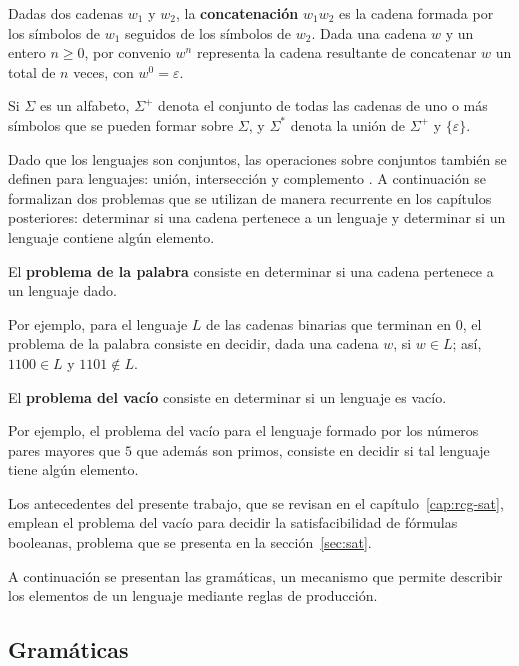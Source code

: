 Dadas dos cadenas $w_1$ y $w_2$, la \textbf{concatenación} $w_1 w_2$
es la cadena formada por los símbolos de $w_1$ seguidos de los símbolos
de $w_2$. Dada una cadena $w$ y un entero $n \ge 0$, por convenio
$w^n$ representa la cadena resultante de concatenar $w$ un total de
$n$ veces, con $w^0 = \varepsilon$.

Si $\Sigma$ es un alfabeto, $\Sigma^+$ denota el conjunto de todas las
cadenas de uno o más símbolos que se pueden formar sobre $\Sigma$, y
$\Sigma^*$ denota la unión de $\Sigma^+$ y $\{\varepsilon\}$.

Dado que los lenguajes son conjuntos, las operaciones sobre conjuntos
también se definen para lenguajes: unión, intersección y complemento
\cite{hopcroft2006introduction}. A continuación se formalizan dos
problemas que se utilizan de manera recurrente en los capítulos
posteriores: determinar si una cadena pertenece a un lenguaje y
determinar si un lenguaje contiene algún elemento.

\begin{definicion}
El \textbf{problema de la palabra} consiste en determinar si una cadena
pertenece a un lenguaje dado.
\end{definicion}

Por ejemplo, para el lenguaje $L$ de las cadenas binarias que terminan
en $0$, el problema de la palabra consiste en decidir, dada una cadena
$w$, si $w \in L$; así, $1100 \in L$ y $1101 \notin L$.

\begin{definicion}
El \textbf{problema del vacío} consiste en determinar si un lenguaje
es vacío.
\end{definicion}

Por ejemplo, el problema del vacío para el lenguaje formado por los
números pares mayores que $5$ que además son primos, consiste en
decidir si tal lenguaje tiene algún elemento.

Los antecedentes del
presente trabajo, que se revisan en el capítulo~\ref{cap:rcg-sat},
emplean el problema del vacío para decidir la satisfacibilidad de
fórmulas booleanas, problema que se presenta en la
sección~\ref{sec:sat}.

A continuación se presentan las gramáticas, un mecanismo
que permite describir los elementos de un lenguaje mediante reglas de
producción.

\subsection{Gramáticas}
\label{sec:gramaticas}


